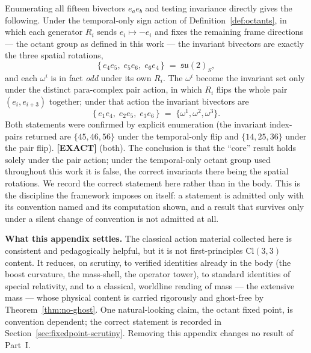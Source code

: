 \documentclass[11pt,oneside]{book}
\newcommand{\Cl}{\mathrm{Cl}}                     %
\newcommand{\status}[1]{{\sffamily\bfseries\color{statuscol}[#1]}}
\theoremstyle{plain}
\theoremstyle{definition}
\theoremstyle{remark}
\begin{document}
Enumerating all fifteen bivectors $e_ae_b$ and testing invariance directly gives the
following. Under the temporal-only sign action of Definition~\ref{def:octants}, in which each
generator $R_i$ sends $e_i\mapsto-e_i$ and fixes the remaining frame directions --- the octant
group as defined in this work --- the invariant bivectors are exactly the three spatial
rotations,
\[
  \{\,e_4e_5,\;e_5e_6,\;e_6e_4\,\}\;=\;\mathfrak{su}(2)_S,
\]
and each $\omega^i$ is in fact \emph{odd} under its own $R_i$. The $\omega^i$ become the
invariant set only under the distinct para-complex pair action, in which $R_i$ flips the whole
pair $(e_i,e_{i+3})$ together; under that action the invariant bivectors are
\[
  \{\,e_1e_4,\;e_2e_5,\;e_3e_6\,\}\;=\;\{\omega^1,\omega^2,\omega^3\}.
\]
Both statements were confirmed by explicit enumeration (the invariant index-pairs returned are
$\{45,46,56\}$ under the temporal-only flip and $\{14,25,36\}$ under the pair flip).
\status{EXACT} (both). The conclusion is that the ``core'' result holds solely under the pair
action; under the temporal-only octant group used throughout this work it is false, the
correct invariants there being the spatial rotations. We record the correct statement here
rather than in the body. This is the discipline the framework imposes on
itself: a statement is admitted only with its convention named and its computation shown, and a
result that survives only under a silent change of convention is not admitted at all.

\begin{leavesbox}
\textbf{What this appendix settles.} The classical action material collected here is
consistent and pedagogically helpful, but it is not first-principles $\Cl(3,3)$ content. It
reduces, on scrutiny, to verified identities already in the body (the boost curvature, the
mass-shell, the operator tower), to standard identities of special relativity, and to a
classical, worldline reading of mass --- the extensive mass --- whose physical content is
carried rigorously and ghost-free by Theorem~\ref{thm:no-ghost}. One natural-looking claim,
the octant fixed point, is convention dependent; the correct statement is recorded in
Section~\ref{sec:fixedpoint-scrutiny}. Removing this appendix changes no result of Part~I.
\end{leavesbox}
\end{document}
